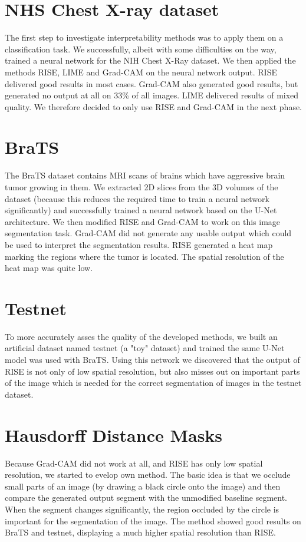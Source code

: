 \section{NHS Chest X-ray dataset}
The first step to investigate interpretability methods was to apply them on a classification task.
We successfully, albeit with some difficulties on the way, trained a neural network for the NIH Chest X-Ray dataset.
We then applied the methods RISE, LIME and Grad-CAM on the neural network output. RISE delivered good results in most cases. Grad-CAM also generated good results, but generated no output at all on 33\% of all images. LIME delivered results of mixed quality. We therefore decided to only use RISE and Grad-CAM in the next phase.

\section{BraTS}
The BraTS dataset contains MRI scans of brains which have aggressive brain tumor growing in them. We extracted 2D slices from the 3D volumes of the dataset (because this reduces the required time to train a neural network significantly) and successfully trained a neural network based on the U-Net architecture. We then modified RISE and Grad-CAM to work on this image segmentation task. Grad-CAM did not generate any usable output which could be used to interpret the segmentation results. RISE generated a heat map marking the regions where the tumor is located. The spatial resolution of the heat map was quite low.

\section{Testnet}
To more accurately asses the quality of the developed methods, we built an artificial dataset named testnet (a "toy" dataset) and trained the same U-Net model was used with BraTS. Using this network we discovered that the output of RISE is not only of low spatial resolution, but also misses out on important parts of the image which is needed for the correct segmentation of images in the testnet dataset.

\section{Hausdorff Distance Masks}
Because Grad-CAM did not work at all, and RISE has only low spatial resolution, we started to evelop own method. 
The basic idea is that we occlude small parts of an image (by drawing a black circle onto the image) and then compare the generated output segment with the unmodified baseline segment. When the segment changes significantly, the region occluded by the circle is important for the segmentation of the image.
The method showed good results on BraTS and testnet, displaying a much higher spatial resolution than RISE.

